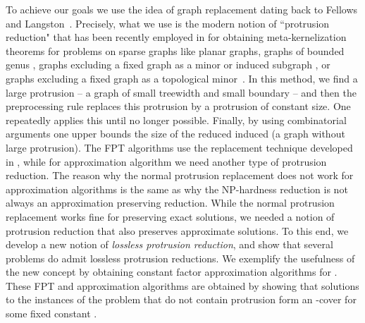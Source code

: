 To achieve our goals we use the idea of graph replacement dating back to Fellows and
Langston~\cite{FellowsL89}.  Precisely, what we use is the modern notion of ``protrusion reduction"  
that has been recently employed  in \cite{H.Bodlaender:2009ng,FominLST10} for obtaining meta-kernelization 
theorems for problems on sparse graphs like planar graphs, graphs of bounded genus \cite{BodlaenderFLPST09}, 
graphs excluding a fixed graph as a minor or induced subgraph \cite{FominLST10,FominLMPS11},  or graphs excluding a fixed graph as a topological minor~\cite{abs-1201-2780}.  In this method, we find a large protrusion -- 
a graph of small treewidth and small boundary -- and then the preprocessing rule replaces this 
protrusion by a protrusion of constant size. One repeatedly applies this until no longer possible. Finally, by using 
combinatorial arguments one upper bounds the size of the reduced induced (a graph without large protrusion). 
The FPT algorithms use the replacement technique developed in \cite{BodlaenderFLPST09,FominLMPS11}, while for approximation algorithm we need another type of protrusion reduction. The reason why the normal protrusion replacement 
does not work for approximation algorithms is the same as why the NP-hardness reduction is not always an approximation preserving reduction. While the normal protrusion replacement works fine for preserving exact solutions, we needed a notion of protrusion reduction that also preserves approximate solutions. To this end, we develop a new notion  of {\em lossless protrusion reduction}, and show that several problems do admit lossless protrusion reductions. We exemplify the usefulness of the new concept by  obtaining constant factor approximation algorithms for \ofd{}. These FPT and approximation algorithms are obtained by showing that  solutions to the instances 
 of the problem that do not contain protrusion form an -cover for some fixed constant .   



